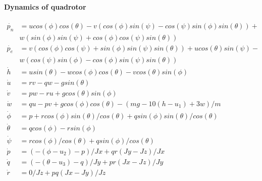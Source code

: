 \begin{appendix}
\paragraph{Dynamics of quadrotor}
%
\begin{align*}
  \dot{p_n} & = u cos(\phi) cos(\theta) - v (cos(\phi)
  sin(\psi)-cos(\psi) sin(\phi) sin(\theta)) + \\ & w (sin(\phi) sin(\psi)+cos(\phi) cos(\psi) sin(\theta))\\
   \dot{p_e} & = v (cos(\phi) cos(\psi)+sin(\phi) sin(\psi)
  sin(\theta)) + u cos(\theta) sin(\psi) - \\ &w (cos(\psi) sin(\phi)-cos(\phi) sin(\psi) sin(\theta))  \\                          
   \dot{h} & = u sin(\theta) - w cos(\phi) cos(\theta)  - v cos(\theta) sin(\phi)\\
   \dot{u} & = r v - q w - g sin(\theta)\\
   \dot{v} & = p w - r u + g cos(\theta) sin(\phi)\\
   \dot{w} & = q u - p v + g cos(\phi) cos(\theta) - (m g - 10 (h - u_1) + 3 w)/m\\
   \dot{\phi} & = p + r cos(\phi) sin(\theta)/cos(\theta) + q sin(\phi) sin(\theta)/cos(\theta)\\
   \dot{\theta} & = q cos(\phi) - r sin(\phi)\\
   \dot{\psi} & = r cos(\phi)/cos(\theta) + q sin(\phi)/cos(\theta)\\
   \dot{p} & = (-(\phi - u_2) - p)/Jx + q r (Jy-Jz)/Jx\\
   \dot{q} & = (-(\theta - u_3) - q)/Jy + p r (Jx-Jz)/Jy\\
   \dot{r} & = 0/Jz + p q (Jx - Jy)/Jz\\
\end{align*}
%
\end{appendix}
